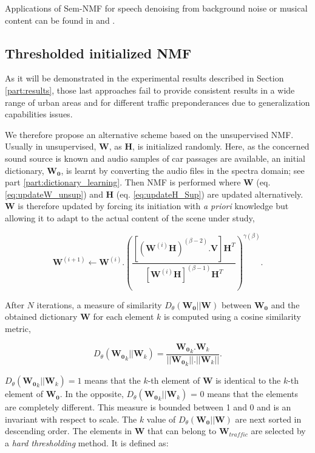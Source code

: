 \documentclass[twocolumn,a4paper,10pt]{article}
\begin{document}
Applications of Sem-NMF for speech denoising from background noise or musical content can be found in \cite{joder2012real} and \cite{weninger2012supervised}.

\subsection{Thresholded initialized NMF}

As it will be demonstrated in the experimental results described in Section \ref{part:results}, those last approaches fail to provide consistent results in a wide range of urban areas and for different traffic preponderances due to generalization capabilities issues.

We therefore propose an alternative scheme based on the unsupervised NMF. Usually in unsupervised, $\mathbf{W}$, as  $\mathbf{H}$, is initialized randomly. Here, as the concerned sound source is known and audio samples of car passages are available, an initial dictionary, $\mathbf{W_0}$, is learnt by converting the audio files in the spectra domain; see part \ref{part:dictionary_learning}. Then NMF is performed where $\mathbf{W}$ (eq. \ref{eq:updateW_unsup}) and $\mathbf{H}$ (eq.  \ref{eq:updateH_Sup}) are updated alternatively. $\mathbf{W}$ is therefore updated by forcing its initiation with \textit{a priori} knowledge but allowing it to adapt to the actual content of the scene under study,

\begin{equation}\label{eq:updateW_unsup}
\textbf{W}^{(i+1)} \leftarrow \mathbf{W}^{(i)}.\left(\frac{\left[\left(\mathbf{W}^{(i)}\mathbf{H} \right)^{(\beta-2)}.\mathbf{V} \right]\mathbf{H}^T}{\left[\mathbf{W}^{(i)}\mathbf{H} \right]^{(\beta-1)}\mathbf{H}^T}\right)^{\gamma(\beta)}.
\end{equation}

After $N$ iterations, a measure of similarity $D_{\theta}\left(\mathbf{W_0} \vert \vert \mathbf{W} \right)$ between $\mathbf{W_0}$ and the obtained dictionary $\mathbf{W}$ for each element $k$ is computed using a cosine similarity metric,

\begin{equation}
D_{\theta}\left(\mathbf{W_0}_k \vert \vert \mathbf{W}_k \right) = \frac{\mathbf{W_0}_k.\mathbf{W}_k}{\vert \vert \mathbf{W_0}_k  \vert \vert . \vert \vert \mathbf{W}_k \vert \vert}.
\end{equation}

$D_{\theta}\left(\mathbf{W_0}_k \vert \vert \mathbf{W}_k \right) = 1$ means that the $k$-th element of $\mathbf{W}$ is identical to the $k$-th element of $\mathbf{W_0}$. In the opposite, $D_{\theta}\left(\mathbf{W_0}_k \vert \vert \mathbf{W}_k \right)$ = 0 means that the elements are completely different. This measure is bounded between 1 and 0 and is an invariant with respect to scale. The $k$ value of $D_{\theta}\left(\mathbf{W_0} \vert \vert \mathbf{W} \right)$ are next sorted in descending order. The elements in $\mathbf{W}$ that can belong to $\mathbf{W}_{traffic}$ are selected by a \textit{hard thresholding} method. It is defined as:
\end{document}
